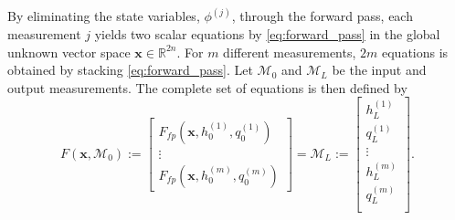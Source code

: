 By eliminating the state variables, $\phi^{(j)}$, through the forward pass, each measurement $j$ yields two scalar equations by \cref{eq:forward_pass} in the global unknown vector space $\mathbf{x}\in\mathbb{R}^{2n}$. For $m$ different measurements, $2m$ equations is obtained by stacking \cref{eq:forward_pass}. Let $\mathcal{M}_0$ and $\mathcal{M}_L$ be the input and output measurements. The complete set of equations is then defined by
\begin{equation}
\label{eq:main_function}
    F(\mathbf{x},\mathcal{M}_0) := 
    \begin{bmatrix}
        F_{fp}(\mathbf{x}, h_0^{(1)},q_0^{(1)})\\
        \vdots\\
        F_{fp}(\mathbf{x}, h_0^{(m)},q_0^{(m)})
    \end{bmatrix}
    = \mathcal{M}_L :=
        \begin{bmatrix}
        h_L^{(1)}\\[0.4em]
        q_L^{(1)}\\
        \vdots\\
        h_L^{(m)}\\[0.4em]
        q_L^{(m)}\\
    \end{bmatrix}.
\end{equation}


\newpage
